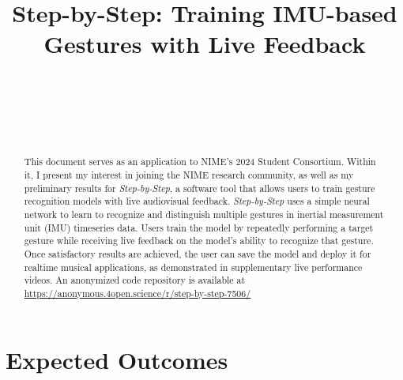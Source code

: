 \documentclass{nime-alternate} %
\begin{document}
\title{Step-by-Step: Training IMU-based Gestures with Live Feedback}


\label{key}


\author{
\alignauthor
{}\\
       \\
       \\
       \\
}

\maketitle
\begin{abstract}
This document serves as an application to NIME's 2024 Student Consortium. Within it, I present my interest in joining the NIME research community, as well as my preliminary results for \textit{Step-by-Step}, a software tool that allows users to train gesture recognition models with live audiovisual feedback. \textit{Step-by-Step} uses a simple neural network to learn to recognize and distinguish multiple gestures in inertial measurement unit (IMU) timeseries data. Users train the model by repeatedly performing a target gesture while receiving live feedback on the model’s ability to recognize that gesture. Once satisfactory results are achieved, the user can save the model and deploy it for realtime musical applications, as demonstrated in supplementary live performance videos. An anonymized code repository is available at \url{https://anonymous.4open.science/r/step-by-step-7506/}
\end{abstract} 

\printccsdesc

\section{Expected Outcomes}
\end{document}
